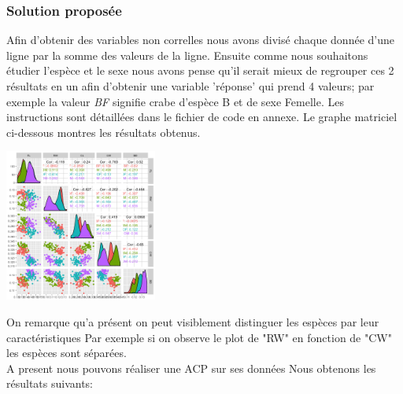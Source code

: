 \documentclass[10pt]{article}
\begin{document}
	\subsubsection{Solution proposée}
	Afin d'obtenir des variables non correlles nous avons divisé chaque donnée d'une ligne par la somme des valeurs de la ligne. Ensuite comme nous souhaitons étudier l'espèce et le sexe nous avons pense qu'il serait mieux de regrouper ces 2 résultats en un afin d'obtenir une variable 'réponse' qui prend 4 valeurs; par exemple la valeur \textit{BF} signifie crabe d'espèce B et de sexe Femelle. Les instructions sont détaillées dans le fichier de code en annexe. Le graphe matriciel  ci-dessous montres les résultats obtenus.
	
	\begin{center}
		\includegraphics[width=50mm]{Figures/Crabs/matricial_plot_decorr_classes.png}	
		\label{fig:crabs_matricial_plot_decorr}
	\end{center}
	On remarque qu'a présent on peut visiblement distinguer les espèces par leur caractéristiques Par exemple si on observe le plot de  "RW" en fonction de "CW" les espèces sont séparées.\\
	A present nous pouvons réaliser une ACP sur ses données Nous obtenons les résultats suivants:
	
\end{document}

